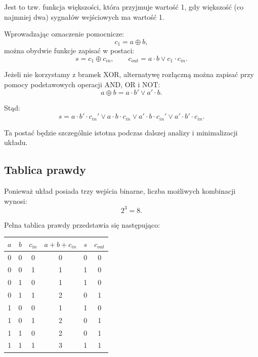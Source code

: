 \documentclass[12pt,a4paper]{article}
\begin{document}
Jest to tzw. funkcja większości, która przyjmuje wartość 1, gdy większość (co najmniej dwa) sygnałów wejściowych ma wartość 1.

Wprowadzając oznaczenie pomocnicze:
\begin{equation*}
c_1 = a \oplus b,
\end{equation*}
można obydwie funkcje zapisać w postaci:
\begin{equation*}
s = c_1 \oplus c_{in}, \qquad c_{out} = a \cdot b \vee c_1 \cdot c_{in}.
\end{equation*}

Jeżeli nie korzystamy z bramek XOR, alternatywę rozłączną można zapisać przy pomocy podstawowych operacji AND, OR i NOT:
\begin{equation*}
a \oplus b = a \cdot b' \vee a' \cdot b.
\end{equation*}

Stąd:
\begin{equation*}
s = a \cdot b' \cdot c_{in}' \vee a \cdot b \cdot c_{in} \vee a' \cdot b \cdot c_{in}' \vee a' \cdot b' \cdot c_{in}.
\end{equation*}

Ta postać będzie szczególnie istotna podczas dalszej analizy i minimalizacji układu.

\subsection{Tablica prawdy}

Ponieważ układ posiada trzy wejścia binarne, liczba możliwych kombinacji wynosi:
\begin{equation*}
2^3 = 8.
\end{equation*}

Pełna tablica prawdy przedstawia się następująco:

\begin{center}
\begin{tabular}{|c|c|c|c|c|c|}
\hline
$a$ & $b$ & $c_{in}$ & $a+b+c_{in}$ & $s$ & $c_{out}$ \\
\hline
0 & 0 & 0 & 0 & 0 & 0 \\
0 & 0 & 1 & 1 & 1 & 0 \\
0 & 1 & 0 & 1 & 1 & 0 \\
0 & 1 & 1 & 2 & 0 & 1 \\
1 & 0 & 0 & 1 & 1 & 0 \\
1 & 0 & 1 & 2 & 0 & 1 \\
1 & 1 & 0 & 2 & 0 & 1 \\
1 & 1 & 1 & 3 & 1 & 1 \\
\hline
\end{tabular}
\end{center}
\end{document}
